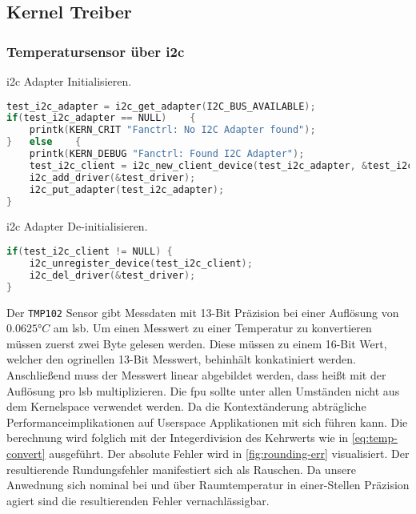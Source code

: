 \subsection{Kernel Treiber}
\subsubsection{Temperatursensor über \acrshort{i2c}}

\Gls{i2c} Adapter Initialisieren.
\begin{lstlisting}[language=C]
test_i2c_adapter = i2c_get_adapter(I2C_BUS_AVAILABLE);
if(test_i2c_adapter == NULL)	{
    printk(KERN_CRIT "Fanctrl: No I2C Adapter found");
}	else	{
    printk(KERN_DEBUG "Fanctrl: Found I2C Adapter");
    test_i2c_client = i2c_new_client_device(test_i2c_adapter, &test_i2c_board_info);
    i2c_add_driver(&test_driver);
    i2c_put_adapter(test_i2c_adapter);
}
\end{lstlisting}

\Gls{i2c} Adapter De-initialisieren.
\begin{lstlisting}[language=C]
if(test_i2c_client != NULL)	{
    i2c_unregister_device(test_i2c_client);
    i2c_del_driver(&test_driver);
}
\end{lstlisting}

Der \texttt{TMP102} Sensor gibt Messdaten mit 13-Bit Präzision bei einer Auflösung von $0.0625\si{\degree C}$ am \gls{lsb}.
Um einen Messwert zu einer Temperatur zu konvertieren müssen zuerst zwei Byte gelesen werden.
Diese müssen zu einem 16-Bit Wert, welcher den ogrinellen 13-Bit Messwert, behinhält konkatiniert werden.
Anschlie{\ss}end muss der Messwert linear abgebildet werden, dass hei{\ss}t mit der Auflösung pro \gls{lsb} multiplizieren.
Die \gls{fpu} sollte unter allen Umständen nicht aus dem Kernelspace verwendet werden.
Da die Kontextänderung abträgliche Performanceimplikationen auf Userspace Applikationen mit sich führen kann.
Die berechnung wird folglich mit der Integerdivision des Kehrwerts wie in \autoref{eq:temp-convert} ausgeführt.
Der absolute Fehler wird in \autoref{fig:rounding-err} visualisiert.
Der resultierende Rundungsfehler manifestiert sich als Rauschen.
Da unsere Anwednung sich nominal bei und über Raumtemperatur in einer-Stellen Präzision agiert sind die resultierenden Fehler vernachlässigbar.

